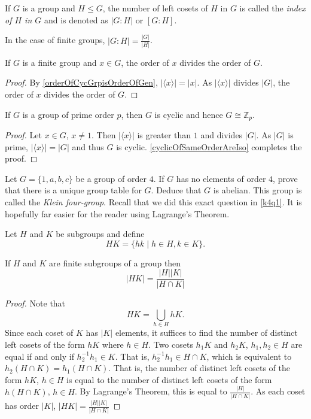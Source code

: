 \begin{definition}
    If $G$ is a group and $H\leq G$, the number of left cosets of $H$ in $G$ is called the \textit{index of $H$ in $G$} and is denoted as $|G:H|$ or $[G:H]$.
\end{definition}

In the case of finite groups, $|G:H|=\frac{|G|}{|H|}$.

\begin{corollary}
\label{orderOfElementDividesOrderofGroup}
    If $G$ is a finite group and $x\in G$, the order of $x$ divides the order of $G$.
\end{corollary}
\begin{proof}
    By \ref{orderOfCycGrpisOrderOfGen}, $|\langle x\rangle|=|x|$. As $|\langle x\rangle|$ divides $|G|$, the order of $x$ divides the order of $G$.
\end{proof}

\begin{corollary}
    If $G$ is a group of prime order $p$, then $G$ is cyclic and hence $G\cong\mathbb{Z}_p$.
\end{corollary}
\begin{proof}
    Let $x\in G$, $x\neq 1$. Then $|\langle x\rangle|$ is greater than $1$ and divides $|G|$. As $|G|$ is prime, $|\langle x\rangle|=|G|$ and thus $G$ is cyclic. \ref{cyclicOfSameOrderAreIso} completes the proof.
\end{proof}

\begin{exercise}
    Let $G=\{1,a,b,c\}$ be a group of order $4$. If $G$ has no elements of order $4$, prove that there is a unique group table for $G$. Deduce that $G$ is abelian. This group is called the \textit{Klein four-group}. Recall that we did this exact question in \ref{k4q1}. It is hopefully far easier for the reader using Lagrange's Theorem.
\end{exercise}

\begin{definition}
    Let $H$ and $K$ be subgroups and define
    $$HK=\{hk\mid h\in H,k\in K\}.$$
\end{definition}

\begin{theorem}
    If $H$ and $K$ are finite subgroups of a group then
    $$|HK|=\frac{|H||K|}{|H\cap K|}$$
\end{theorem}
\begin{proof}
    Note that $$HK=\bigcup_{h\in H}hK.$$
    Since each coset of $K$ has $|K|$ elements, it suffices to find the number of distinct left cosets of the form $hK$ where $h\in H$. Two cosets $h_1K$ and $h_2K$, $h_1,h_2\in H$ are equal if and only if $h_2^{-1}h_1\in K$. That is, $h_2^{-1}h_1\in H\cap K$, which is equivalent to $h_2(H\cap K)=h_1(H\cap K)$. That is, the number of distinct left cosets of the form $hK$, $h\in H$ is equal to the number of distinct left cosets of the form $h(H\cap K)$, $h\in H$. By Lagrange's Theorem, this is equal to $\frac{|H|}{|H\cap K|}$. As each coset has order $|K|$, $|HK|=\frac{|H||K|}{|H\cap K|}$
\end{proof}

